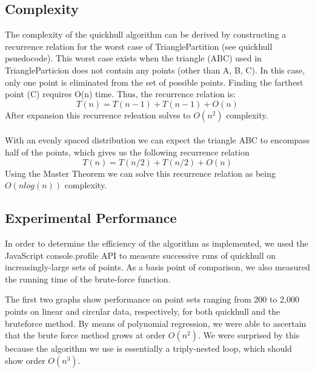 \documentclass[11pt]{article}
\begin{document}
\subsection{Complexity}
The complexity of the quickhull algorithm can be derived by constructing a recurrence relation for the worst case of TrianglePartition (see quickhull psuedocode). This worst case exists when the triangle (ABC) used in TriangleParticion does not contain any points (other than A, B, C). In this case, only one point is eliminated from the set of possible points. Finding the farthest point (C) requires O(n) time. Thus, the recurrence relation is:
\[ T(n) = T(n - 1) + T(n - 1) + O(n) \]
After expansion this recurrence releation solves to $O(n^2)$ complexity\cite{Kent:QH}.
\\
\\
With an evenly spaced distribution we can expect the triangle ABC to encompass half of the points, which gives us the following recurrence relation
\[ T(n) = T(n / 2) + T(n / 2) + O(n) \]
Using the Master Theorem we can solve this recurrence relation as being $O(n log(n))$ complexity\cite{Kent:QH}.

\subsection{Experimental Performance}
In order to determine the efficiency of the algorithm as implemented, we used the JavaScript console.profile API to measure successive runs of quickhull on increasingly-large sets of points. As a basis point of comparison, we also measured the running time of the brute-force function.

The first two graphs show performance on point sets ranging from 200 to 2,000 points on linear and circular data, respectively, for both quickhull and the bruteforce method. By means of polynomial regression, we were able to ascertain that the brute force method grows at order $O(n^2)$. We were surprised by this because the algorithm we use is essentially a triply-nested loop, which should show order $O(n^3)$.
\end{document}
